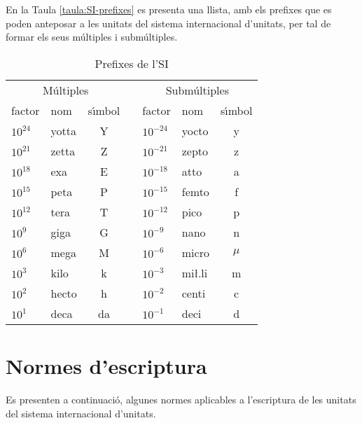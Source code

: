 En la Taula \vref{taula:SI-prefixes} es presenta una llista, amb els
prefixes que es poden anteposar a les unitats del sistema
internacional d'unitats, per tal de formar els seus m\'{u}ltiples i
subm\'{u}ltiples.

\begin{table}[h]
   \caption{\label{taula:SI-prefixes} Prefixes de  l'SI}
   \begin{center}\begin{tabular}{llccllc}
   \toprule[1pt]
   \multicolumn{3}{c}{M\'{u}ltiples} & & \multicolumn{3}{c}{Subm\'{u}ltiples}\\
   \cmidrule(rl){1-3} \cmidrule(rl){5-7}
   factor & nom & s\'{\i}mbol & & factor & nom & s\'{\i}mbol\\
   \midrule
    $10^{24}$ &  yotta & Y & & $10^{-24}$ & yocto & y \\
    $10^{21}$ &  zetta & Z & & $10^{-21}$ & zepto & z \\
    $10^{18}$ &  exa & E & & $10^{-18}$ & atto & a \\
    $10^{15}$ &  peta & P & & $10^{-15}$ & femto & f \\
    $10^{12}$ &  tera & T & & $10^{-12}$ & pico & p \\
    $10^{9}$ &  giga & G & & $10^{-9}$ & nano & n \\
    $10^{6}$ &  mega & M & & $10^{-6}$ & micro & $\mu$ \\
    $10^{3}$ &  kilo & k & & $10^{-3}$ & mi{\l.l}i & m \\
    $10^{2}$ &  hecto & h & & $10^{-2}$ & centi & c \\
    $10^{1}$ &  deca & da & & $10^{-1}$ & deci & d \\
    \bottomrule[1pt]
   \end{tabular} \end{center}
\end{table}
      
      
     

\section{Normes d'escriptura}

Es presenten a continuaci\'{o}, algunes normes aplicables a l'escriptura
de les unitats del sistema internacional d'unitats.

